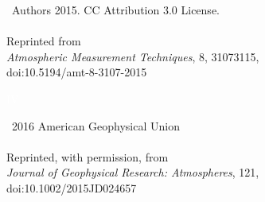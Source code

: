 \documentclass[11pt,b5paper]{book}
\begin{document}
\vspace*{-12cm}
\noindent{}\textcopyright~Authors 2015. CC Attribution 3.0 License. \\
\\
\noindent{}Reprinted from \\
\noindent{}\textit{Atmospheric Measurement Techniques}, 8,  3107\textendash{}3115, \\
\noindent{}doi:10.5194/amt-8-3107-2015
\newpage
\clearpage
\thispagestyle{empty}
\mbox{}
%
\thispagestyle{empty}
\mbox{}
\thispagestyle{empty}
\vspace*{16.5cm} \begin{tcolorbox}[left skip=13.8cm,colframe=black,width=1.3cm,height=5cm,colback={black},outer arc=0mm,valign=center]
  \vspace*{-1cm}\hspace*{-0.35cm}\Huge{\textcolor{white}{IV}}
\end{tcolorbox}
\vspace*{-18.1cm}
\noindent{}\textcopyright~2016 American Geophysical Union \\
\\
\noindent{}Reprinted, with permission, from \\
\noindent{}\textit{Journal of Geophysical Research: Atmospheres}, 121, \\
\noindent{}doi:10.1002/2015JD024657
\newpage
\clearpage
\thispagestyle{empty}
\mbox{}
\newpage
\clearpage
%


\end{document}
